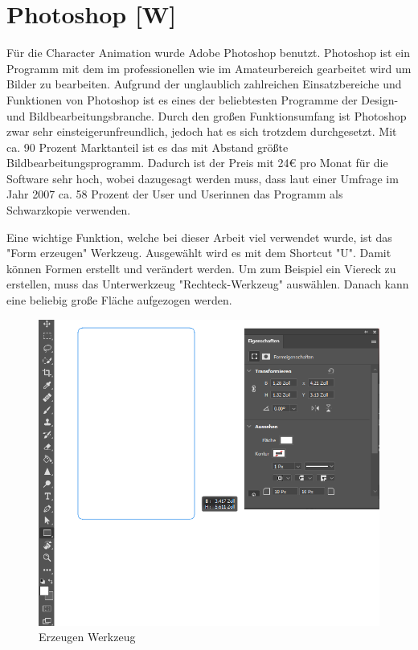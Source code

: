 \section{Photoshop [W]}
Für die Character Animation wurde Adobe Photoshop benutzt. Photoshop ist ein Programm mit dem
im professionellen wie im Amateurbereich gearbeitet wird um Bilder zu bearbeiten.
Aufgrund der unglaublich zahlreichen Einsatzbereiche und Funktionen von Photoshop ist es
eines der beliebtesten Programme der Design- und Bildbearbeitungsbranche.
Durch den großen Funktionsumfang ist Photoshop zwar sehr einsteigerunfreundlich, jedoch
hat es sich trotzdem durchgesetzt. Mit ca. 90 Prozent Marktanteil ist es das mit Abstand größte
Bildbearbeitungsprogramm. Dadurch ist der Preis mit 24€ pro Monat für die Software sehr hoch, wobei dazugesagt werden muss,
dass laut einer Umfrage im Jahr 2007 ca. 58 Prozent der User und Userinnen das Programm als Schwarzkopie verwenden.

Eine wichtige Funktion, welche bei dieser Arbeit viel verwendet wurde, ist das "Form erzeugen" Werkzeug. Ausgewählt wird es mit dem Shortcut "U". Damit können Formen erstellt und verändert werden. Um zum Beispiel ein Viereck zu erstellen, muss das Unterwerkzeug "Rechteck-Werkzeug" auswählen. Danach
kann eine beliebig große Fläche aufgezogen werden.
\begin{figure}[H]
    \centering
    \includegraphics[scale=0.7]{pics/erzeugen.png}
    \caption{Erzeugen Werkzeug}
\end{figure}

